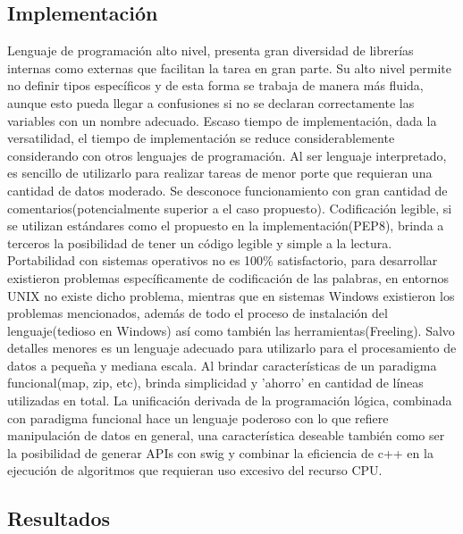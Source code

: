 \documentclass[12pt]{article}
\begin{document}
\subsection{Implementación}
Lenguaje de programación alto nivel, presenta gran diversidad de librerías internas como externas que facilitan la tarea en gran parte. Su alto nivel permite no definir tipos específicos y de esta forma se trabaja de manera más fluida, aunque esto pueda llegar a confusiones si no se declaran correctamente las variables con un nombre adecuado.
Escaso tiempo de implementación, dada la versatilidad, el tiempo de implementación se reduce considerablemente considerando con otros lenguajes de programación.
Al ser lenguaje interpretado, es sencillo de utilizarlo para realizar tareas de menor porte que requieran una cantidad de datos moderado. Se desconoce funcionamiento con gran cantidad de comentarios(potencialmente superior a el caso propuesto).
Codificación legible, si se utilizan estándares como el propuesto en la implementación(PEP8), brinda a terceros la posibilidad de tener un código legible y simple a la lectura.
Portabilidad con sistemas operativos no es 100\% satisfactorio, para desarrollar existieron problemas específicamente de codificación de las palabras, en entornos UNIX no existe dicho problema, mientras que en sistemas Windows existieron los problemas mencionados, además de todo el proceso de instalación del lenguaje(tedioso en Windows) así como también las herramientas(Freeling).
Salvo detalles menores es un lenguaje adecuado para utilizarlo para el procesamiento de datos a pequeña y mediana escala.
Al brindar características de un paradigma funcional(map, zip, etc), brinda simplicidad y 'ahorro' en cantidad de líneas utilizadas en total.
La unificación derivada de la programación lógica, combinada con paradigma funcional hace un lenguaje poderoso con lo que refiere manipulación de datos en general, una característica deseable también como  ser la posibilidad de generar APIs con swig y combinar la eficiencia de c++ en la ejecución de algoritmos que requieran uso excesivo del recurso CPU. 

\subsection{Resultados}

%
%
\end{document}
